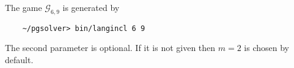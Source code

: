 The game $\mathcal{G}_{6,9}$ is generated by
\begin{verbatim}
    ~/pgsolver> bin/langincl 6 9
\end{verbatim}
The second parameter is optional. If it is not given then $m=2$ is chosen by default.


 

